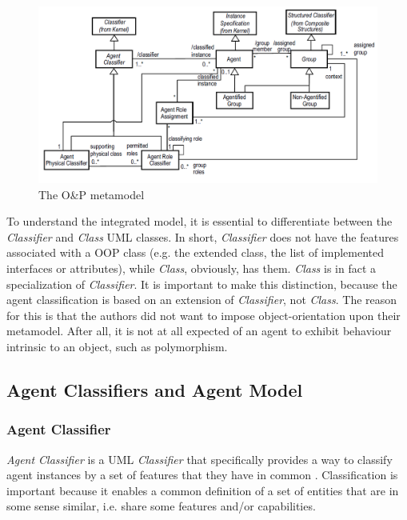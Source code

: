 \begin{figure}[ht]
	\centering
	\includegraphics[width=\textwidth]{images/onp/onp-metamodel.png}
	\caption{The O\&P metamodel \cite{Odell05}}
	\label{figure:onp-metamodel}
\end{figure}

To understand the integrated model, it is essential to differentiate between the \textit{Classifier} and \textit{Class} UML classes.
In short, \textit{Classifier} does not have the features associated with a OOP class (e.g. the extended class, the list of implemented interfaces or attributes), while \textit{Class}, obviously, has them.
\textit{Class} is in fact a specialization of \textit{Classifier}.
It is important to make this distinction, because the agent classification is based on an extension of \textit{Classifier}, not \textit{Class}.
The reason for this is that the authors did not want to impose object-orientation upon their metamodel.
After all, it is not at all expected of an agent to exhibit behaviour intrinsic to an object, such as polymorphism.

\subsection{Agent Classifiers and Agent Model}

\subsubsection*{Agent Classifier}

\textit{Agent Classifier} is a UML \textit{Classifier} that specifically provides a way to classify agent instances by a set of features that they have in common \cite{Odell05}.
Classification is important because it enables a common definition of a set of entities that are in some sense similar, i.e. share some features and/or capabilities.


